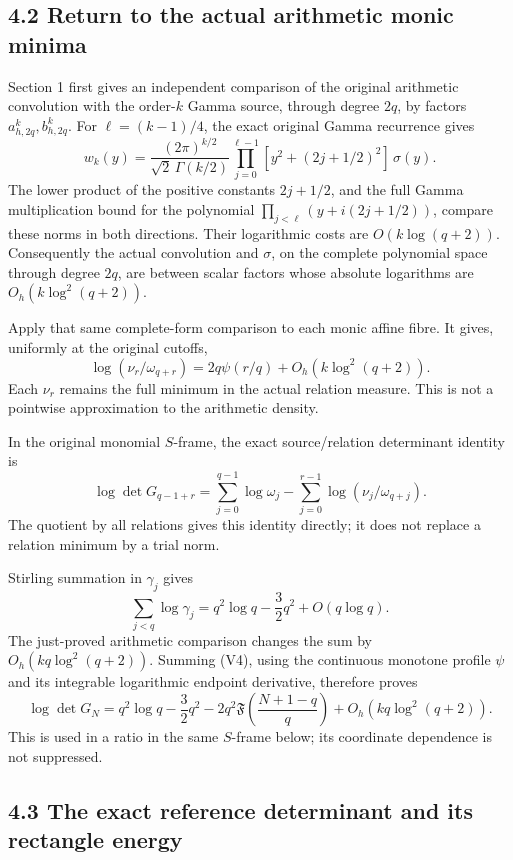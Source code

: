 \documentclass[11pt]{article}
\begin{document}
\subsection{4.2 Return to the actual arithmetic monic minima}\label{return-to-the-actual-arithmetic-monic-minima}

Section 1 first gives an independent comparison of the original arithmetic convolution with the order-\(k\) Gamma source, through degree \(2q\), by factors \(a_{h,2q}^k,b_{h,2q}^k\). For \(\ell=(k-1)/4\), the exact original Gamma recurrence gives \[
 w_k(y)=\frac{(2\pi)^{k/2}}{\sqrt2\,\Gamma(k/2)}
 \prod_{j=0}^{\ell-1}[y^2+(2j+1/2)^2]\,\sigma(y). \tag{V3}
\] The lower product of the positive constants \(2j+1/2\), and the full Gamma multiplication bound for the polynomial \(\prod_{j<\ell}(y+i(2j+1/2))\), compare these norms in both directions. Their logarithmic costs are \(O(k\log(q+2))\). Consequently the actual convolution and \(\sigma\), on the complete polynomial space through degree \(2q\), are between scalar factors whose absolute logarithms are \(O_h(k\log^2(q+2))\).

Apply that same complete-form comparison to each monic affine fibre. It gives, uniformly at the original cutoffs, \[
 \log(\nu_r/\omega_{q+r})
 =2q\psi(r/q)+O_h(k\log^2(q+2)). \tag{V4}
\] Each \(\nu_r\) remains the full minimum in the actual relation measure. This is not a pointwise approximation to the arithmetic density.

In the original monomial \(S\)-frame, the exact source/relation determinant identity is \[
 \log\det G_{q-1+r}
 =\sum_{j=0}^{q-1}\log\omega_j
  -\sum_{j=0}^{r-1}\log(\nu_j/\omega_{q+j}). \tag{V5}
\] The quotient by all relations gives this identity directly; it does not replace a relation minimum by a trial norm.

Stirling summation in \(\gamma_j\) gives \[
 \sum_{j<q}\log\gamma_j
 =q^2\log q-\frac32q^2+O(q\log q).
\] The just-proved arithmetic comparison changes the sum by \(O_h(kq\log^2(q+2))\). Summing (V4), using the continuous monotone profile \(\psi\) and its integrable logarithmic endpoint derivative, therefore proves \[
 \boxed{
 \log\det G_N
 =q^2\log q-\frac32q^2
  -2q^2\mathfrak F\!\left(\frac{N+1-q}{q}\right)
  +O_h(kq\log^2(q+2)).
 } \tag{V6}
\] This is used in a ratio in the same \(S\)-frame below; its coordinate dependence is not suppressed.

\subsection{4.3 The exact reference determinant and its rectangle energy}\label{the-exact-reference-determinant-and-its-rectangle-energy}
\end{document}
